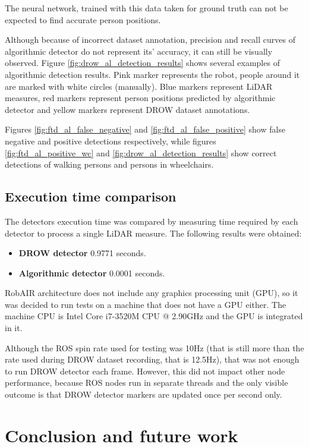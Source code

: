 \documentclass{article}
\begin{document}
The neural network, trained with this data taken for ground truth can not be expected to find accurate person positions.

Although because of incorrect dataset annotation, precision and recall curves of algorithmic detector do not represent its' accuracy, it can still be visually observed.
Figure \ref{fig:drow_al_detection_results} shows several examples of algorithmic detection results.
Pink marker represents the robot, people around it are marked with white circles (manually).
Blue markers represent LiDAR measures, red markers represent person positions predicted by algorithmic detector and yellow markers represent DROW dataset annotations.

Figures \ref{fig:ftd_al_false_negative} and \ref{fig:ftd_al_false_positive} show false negative and positive detections respectively,
while figures \ref{fig:ftd_al_positive_wc} and \ref{fig:drow_al_detection_results} show correct detections of walking persons and persons in wheelchairs.

\subsection{Execution time comparison}

The detectors execution time was compared by measuring time required by each detector to process a single LiDAR measure.
The following results were obtained:

\begin{itemize}
	\item \textbf{DROW detector} 0.9771 seconds.
	\item \textbf{Algorithmic detector} 0.0001 seconds.
\end{itemize}

RobAIR architecture does not include any graphics processing unit (GPU), so it was decided to run tests on a machine that does not have a GPU either.
The machine CPU is Intel\textregistered{} Core\texttrademark{} i7-3520M CPU @ 2.90GHz and the GPU is integrated in it.

Although the ROS spin rate used for testing was 10Hz (that is still more than the rate used during DROW dataset recording, that is 12.5Hz), that was not enough to run DROW detector each frame.
However, this did not impact other node performance, because ROS nodes run in separate threads and the only visible outcome is that DROW detector markers are updated once per second only.

\section{Conclusion and future work}
\end{document}
